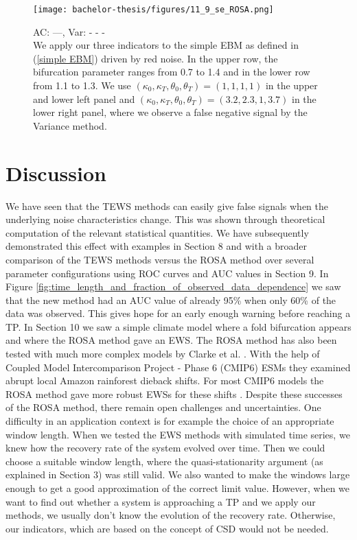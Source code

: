 \documentclass[%
thesis=student,%
coverpage=false,%
titlepage=false,%
headmarks=true, %
english,%
font=libertine, %
math=newpxtx, %
BCOR=5mm,%
coverBCOR=11mm%
]{tumbook}
\begin{document}
\begin{figure}[b]
    \centering
    \texttt{[image: bachelor-thesis/figures/11\_9\_se\_ROSA.png]}
    \caption{ AC: ---, Var: - - - \\ We apply our three indicators to the simple EBM as defined in (\ref{simple EBM}) driven by red noise. In the upper row, the bifurcation parameter ranges from 0.7 to 1.4  and in the lower row from 1.1 to 1.3. We use $(\kappa_{0},\kappa_{T},\theta_{0},\theta_{T}) = (1,1,1,1)$ in the upper and lower left panel and $(\kappa_{0},\kappa_{T},\theta_{0},\theta_{T}) = (3.2,2.3,1,3.7)$ in the lower right panel, where we observe a false negative signal by the Variance method.}
    \label{fig:ROSA test}
\end{figure}



\chapter{Discussion}

We have seen that the TEWS methods can easily give false signals when the underlying noise characteristics change. This was shown through theoretical computation of the relevant statistical quantities. We have subsequently demonstrated this effect with examples in Section 8 and with a broader comparison of the TEWS methods versus the ROSA method over several parameter configurations using ROC curves and AUC values in Section 9. In Figure \ref{fig:time_length_and_fraction_of_observed_data_dependence} we saw that the new method had an AUC value of already 95\% when only 60\% of the data was observed. This gives hope for an early enough warning before reaching a TP. 
In Section 10 we saw a simple climate model where a fold bifurcation appears and where the ROSA method gave an EWS. The ROSA method has also been tested with much more complex models by Clarke et al. \cite{Clarke:2023}. With the help of Coupled Model Intercomparison Project - Phase 6 (CMIP6) ESMs they examined abrupt local Amazon rainforest dieback shifts. For most CMIP6 models the ROSA method gave more robust EWSs for these shifts \cite{Clarke:2023}.
Despite these successes of the ROSA method, there remain open challenges and uncertainties. One difficulty in an application context is for example the choice of an appropriate window length. When we tested the EWS methods with simulated time series, we knew how the recovery rate of the system evolved over time. Then we could choose a suitable window length, where the quasi-stationarity argument (as explained in Section 3) was still valid. We also wanted to make the windows large enough to get a good approximation of the correct limit value. However, when we want to find out whether a system is approaching a TP and we apply our methods, we usually don't know the evolution of the recovery rate. Otherwise, our indicators, which are based on the concept of CSD would not be needed. 
\end{document}
